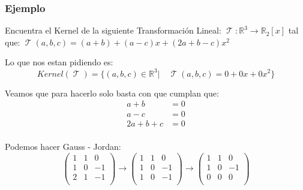 \documentclass[12pt]{report}                                    %
\DeclareMathOperator \LinealTransformation {\mathcal{T}}
\begin{document}
            \clearpage
            \subsubsection{Ejemplo}
            Encuentra el Kernel de la siguiente Transformación Lineal:
            $\LinealTransformation : \mathbb{R}^3 \to \mathbb{R}_2[x]$ tal que: 
            $\LinealTransformation(a,b,c) = (a+b) + (a-c)x + (2a+b-c)x^2$

            Lo que nos estan pidiendo es:
            \begin{equation*}
                Kernel(\LinealTransformation) = 
                \{(a,b,c)\in \mathbb{R}^3 |\quad \LinealTransformation(a,b,c) = 0+0x+0x^2\}
            \end{equation*}

            Veamos que para hacerlo solo basta con que cumplan que:
            \begin{equation*}
            \begin{split}
                a + b       & = 0 \\
                a - c       & = 0 \\
                2a + b + c  & = 0 \\
            \end{split}
            \end{equation*}

            Podemos hacer Gauss - Jordan:
            \begin{equation*}
                \begin{pmatrix} 1&1&0 \\ 1&0&-1 \\ 2&1&-1 \\\end{pmatrix} \to
                \begin{pmatrix} 1&1&0 \\ 1&0&-1 \\ 1&0&-1 \\\end{pmatrix} \to
                \begin{pmatrix} 1&1&0 \\ 1&0&-1 \\ 0&0&0  \\\end{pmatrix}
            \end{equation*}
\end{document}
